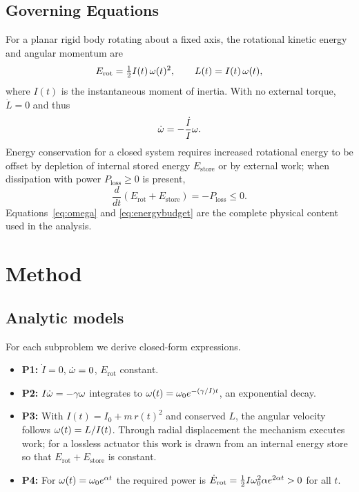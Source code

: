 \documentclass[11pt,twoside]{article}
\begin{document}
\subsection{Governing Equations}
\label{sec:gov}
For a planar rigid body rotating about a fixed axis, the rotational kinetic
energy and angular momentum are
\begin{equation}
E_{\mathrm{rot}}=\tfrac12 I(t)\,\omega(t)^2, \qquad L(t)=I(t)\,\omega(t),
\label{eq:energy}
\end{equation}
where $I(t)$ is the instantaneous moment of inertia. With no external torque,
$\dot{L}=0$ and thus
\begin{equation}
\dot{\omega} = -\frac{\dot I}{I}\omega .
\label{eq:omega}
\end{equation}
Energy conservation for a closed system requires increased rotational energy to
be offset by depletion of internal stored energy $E_{\mathrm{store}}$ or by
external work; when dissipation with power $P_{\mathrm{loss}}\ge 0$ is present,
\begin{equation}
\frac{d}{dt}\left(E_{\mathrm{rot}}+E_{\mathrm{store}}\right)
= -P_{\mathrm{loss}}\le 0 .
\label{eq:energybudget}
\end{equation}
Equations~\eqref{eq:omega} and \eqref{eq:energybudget} are the complete physical
content used in the analysis.

\section{Method}
\label{sec:method}
\subsection{Analytic models}
\label{ssec:analytic}
For each subproblem we derive closed-form expressions.
\begin{itemize}
\item \textbf{P1:} $\dot I=0$, $\dot{\omega}=0$, $E_{\mathrm{rot}}$ constant.
\item \textbf{P2:} $I\dot{\omega}=-\gamma\omega$ integrates to
$\omega(t)=\omega_0 e^{-(\gamma/I)t}$, an exponential decay.
\item \textbf{P3:} With $I(t)=I_0+m\,r(t)^2$ and conserved $L$, the angular
velocity follows $\omega(t)=L/I(t)$. Through radial displacement the mechanism
executes work; for a lossless actuator this work is drawn from an internal
energy store so that $E_{\mathrm{rot}}+E_{\mathrm{store}}$ is constant.
\item \textbf{P4:} For $\omega(t)=\omega_0 e^{\alpha t}$ the required power is
$\dot E_{\mathrm{rot}}=\frac12 I\omega_0^2\alpha e^{2\alpha t}>0$ for all $t$.
\end{itemize}
\end{document}
